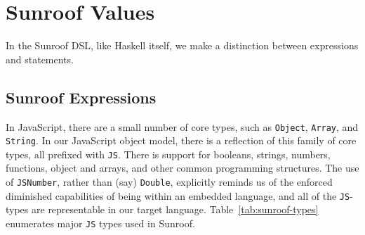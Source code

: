 \documentclass{llncs}
\newcommand{\Src}[1]{{\tt{#1}}}
\begin{document}
\section{Sunroof Values}
\label{sec:object-model}

In the Sunroof DSL, like Haskell itself, we make a distinction between expressions and statements.

\subsection{Sunroof Expressions}

In JavaScript, there are a small number of core types, such as \Src{Object}, \Src{Array}, and \Src{String}.
In our JavaScript object model, there is a reflection of this family of core types, all prefixed with \Src{JS}.
There is support for booleans, strings, numbers, functions,
object and arrays, and other common programming structures.
The use of \Src{JSNumber}, rather than (say) \Src{Double},
explicitly reminds us of the enforced diminished capabilities of
being within an embedded language,
and all of the \Src{JS}-types are representable in our target language.
Table~\ref{tab:sunroof-types} enumerates major \Src{JS} types used in Sunroof.
\end{document}
